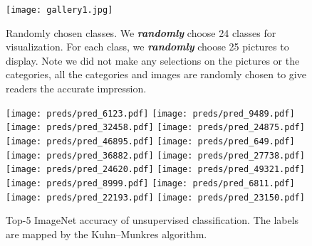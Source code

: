 \documentclass[10pt,twocolumn,letterpaper]{article}
\begin{document}
\captionsetup{width=.85\textwidth}
\begin{figure*}
\centering
\centering
\texttt{[image: gallery1.jpg]}
\caption{Randomly chosen classes. We \textit{\textbf{randomly}} choose 24 classes for visualization. For each class, we \textit{\textbf{randomly}} choose 25 pictures to display. Note we did not make any selections on the pictures or the categories, all the categories and images are randomly chosen to give readers the accurate impression.}
\label{fig:randomcls}
\end{figure*}

\captionsetup{width=1.0\textwidth}
\begin{figure*}
\hspace*{-0.14cm}\hspace*{0.05cm}\texttt{[image: preds/pred\_6123.pdf]}
\hspace*{-0.1cm}\hspace*{0.39cm}\texttt{[image: preds/pred\_9489.pdf]}
\hspace*{-0.2cm}\texttt{[image: preds/pred\_32458.pdf]}
\hspace*{-0.17cm}\hspace*{0.04cm}\texttt{[image: preds/pred\_24875.pdf]}
\hspace*{-0.2cm}\texttt{[image: preds/pred\_46895.pdf]}
\hspace*{-0.2cm}\hspace*{0.15cm}\texttt{[image: preds/pred\_649.pdf]}
\hspace*{0.0cm}\hspace*{-0.1cm}\texttt{[image: preds/pred\_36882.pdf]}
\hspace*{0.11cm}\texttt{[image: preds/pred\_27738.pdf]}
\hspace*{0.0cm}\hspace*{-0.1cm}\texttt{[image: preds/pred\_24620.pdf]}
\hspace*{-0.0cm}\hspace*{0.21cm}\texttt{[image: preds/pred\_49321.pdf]}
\hspace*{0.12cm}\hspace*{-0.1cm}\texttt{[image: preds/pred\_8999.pdf]}
\hspace*{-0.7cm}\texttt{[image: preds/pred\_6811.pdf]}
\hspace*{-0.1cm}\hspace*{-0.1cm}\texttt{[image: preds/pred\_22193.pdf]}
\hspace*{0.3cm}\hspace*{-0.07cm}\texttt{[image: preds/pred\_23150.pdf]}

\caption{Top-5 ImageNet accuracy of unsupervised classification. The labels are mapped by the Kuhn–Munkres algorithm.}
\label{fig:top5}
\end{figure*}
\end{document}

